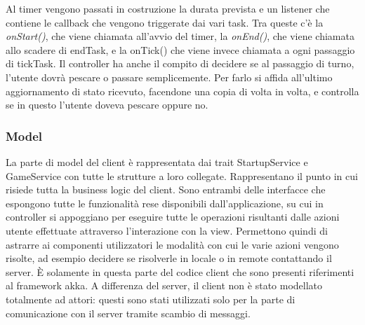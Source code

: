 Al timer vengono passati in costruzione la durata prevista e un listener che contiene le callback che vengono triggerate dai vari task. Tra queste c’è la \textit{onStart()}, che viene chiamata all’avvio del timer, la \textit{onEnd()}, che viene chiamata allo scadere di endTask, e la onTick() che viene invece chiamata a ogni passaggio di tickTask. \newline \newline Il controller ha anche il compito di decidere se al passaggio di turno, l’utente dovrà pescare o passare semplicemente. Per farlo si affida all’ultimo aggiornamento di stato ricevuto, facendone una copia di volta in volta, e controlla se in questo l’utente doveva pescare oppure no.
\subsubsection{Model}
La parte di model del client è rappresentata dai trait StartupService e GameService con tutte le strutture a loro collegate. Rappresentano il punto in cui risiede tutta la business logic del client. Sono entrambi delle interfacce che espongono tutte le funzionalità rese disponibili dall’applicazione, su cui in controller si appoggiano per eseguire tutte le operazioni risultanti dalle azioni utente effettuate attraverso l’interazione con la view. \newline Permettono quindi di astrarre ai componenti utilizzatori le modalità con cui le varie azioni vengono risolte, ad esempio decidere se risolverle in locale o in remote contattando il server.
È solamente in questa parte del codice client che sono presenti riferimenti al framework akka. A differenza del server, il client non è stato modellato totalmente ad attori: questi sono stati utilizzati solo per la parte di comunicazione con il server tramite scambio di messaggi.
